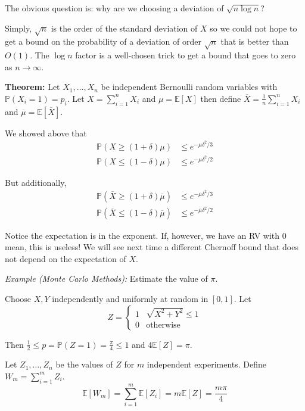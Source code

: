 \documentclass[12pt]{report}
\renewcommand{\P}{\mathbb{P}}
\newcommand{\E}{\mathbb{E}}
\renewcommand{\bar}[1]{\overline{#1}}
\newenvironment*{proposition}[1][gray]{
    \begin{tcolorbox}[
        parbox=false,
        colback=#1!5!white,
        colframe=#1!75!black,
        breakable
    ]}
    {\end{tcolorbox}}
\begin{document}
The obvious question is: why are we choosing a deviation of $\sqrt{n \log n}$? 

Simply, $\sqrt{n}$ is the order of the standard deviation of $X$ so we could not hope to get a bound on the probability of a deviation of order $\sqrt{n}$ that is better than $O(1)$. The $\log n$ factor is a well-chosen trick to get a bound that goes to zero as $n \to \infty$.

\begin{proposition}
    \textbf{Theorem:} Let $X_1, \dots, X_n$ be independent Bernoulli random variables with $\P(X_i = 1) = p_i$. Let $X = \sum_{i=1}^n X_i$ and $\mu = \E[X]$ then define $\bar X = \frac{1}{n} \sum_{i=1}^n X_i$ and $\bar \mu = \E[\bar X]$. 
    
    We showed above that 
    \begin{align*}
        \P(X \geq (1 + \delta)\mu) &\leq e^{-\mu \delta^2/3}\\ 
        \P(X \leq (1 - \delta)\mu) &\leq e^{-\mu \delta^2/2}
    \end{align*}

    But additionally, 
    \begin{align*}
        \P(\bar X \geq (1 + \delta)\bar \mu) &\leq e^{-\bar \mu \delta^2/3}\\ 
        \P(\bar X \leq (1 - \delta)\bar \mu) &\leq e^{-\bar \mu \delta^2/2}
    \end{align*}

\end{proposition}

Notice the expectation is in the exponent. If, however, we have an RV with $0$ mean, this is useless! We will see next time a different Chernoff bound that does not depend on the expectation of $X$.


\emph{Example (Monte Carlo Methods):} Estimate the value of $\pi$. 

Choose $X, Y$ independently and uniformly at random in $[0, 1]$. Let 
\[Z = \begin{cases}
    1 & \sqrt{X^2 + Y^2} \leq 1\\ 
    0 & \text{otherwise}
\end{cases}\]

Then $\frac{1}{2} \leq p = \P(Z = 1) = \frac{\pi}{4} \leq 1$ and $4\E[Z] = \pi$.

Let $Z_1, \dots, Z_n$ be the values of $Z$ for $m$ independent experiments. Define $W_m = \sum_{i=1}^m Z_i$. 
\[\E[W_m] = \sum_{i=1}^m \E[Z_i] = m \E[Z] = \frac{m\pi}{4}\]
\end{document}
